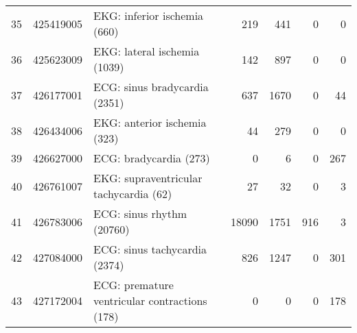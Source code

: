 \begin{tabular}{lllrrrr}
35 & 425419005 & EKG: inferior ischemia (660) & {\cellcolor[HTML]{8DBFA2}} \color[HTML]{000000} 219 & {\cellcolor[HTML]{2E8B57}} \color[HTML]{F1F1F1} 441 & {\cellcolor[HTML]{EBF3ED}} \color[HTML]{000000} 0 & {\cellcolor[HTML]{EBF3ED}} \color[HTML]{000000} 0 \\
36 & 425623009 & EKG: lateral ischemia (1039) & {\cellcolor[HTML]{CDE2D6}} \color[HTML]{000000} 142 & {\cellcolor[HTML]{2E8B57}} \color[HTML]{F1F1F1} 897 & {\cellcolor[HTML]{EBF3ED}} \color[HTML]{000000} 0 & {\cellcolor[HTML]{EBF3ED}} \color[HTML]{000000} 0 \\
37 & 426177001 & ECG: sinus bradycardia (2351) & {\cellcolor[HTML]{A3CBB4}} \color[HTML]{000000} 637 & {\cellcolor[HTML]{2E8B57}} \color[HTML]{F1F1F1} 1670 & {\cellcolor[HTML]{EBF3ED}} \color[HTML]{000000} 0 & {\cellcolor[HTML]{E7F0EA}} \color[HTML]{000000} 44 \\
38 & 426434006 & EKG: anterior ischemia (323) & {\cellcolor[HTML]{CDE2D6}} \color[HTML]{000000} 44 & {\cellcolor[HTML]{2E8B57}} \color[HTML]{F1F1F1} 279 & {\cellcolor[HTML]{EBF3ED}} \color[HTML]{000000} 0 & {\cellcolor[HTML]{EBF3ED}} \color[HTML]{000000} 0 \\
39 & 426627000 & ECG: bradycardia (273) & {\cellcolor[HTML]{EBF3ED}} \color[HTML]{000000} 0 & {\cellcolor[HTML]{E7F1EA}} \color[HTML]{000000} 6 & {\cellcolor[HTML]{EBF3ED}} \color[HTML]{000000} 0 & {\cellcolor[HTML]{2E8B57}} \color[HTML]{F1F1F1} 267 \\
40 & 426761007 & EKG: supraventricular tachycardia (62) & {\cellcolor[HTML]{4B9B6E}} \color[HTML]{F1F1F1} 27 & {\cellcolor[HTML]{2E8B57}} \color[HTML]{F1F1F1} 32 & {\cellcolor[HTML]{EBF3ED}} \color[HTML]{000000} 0 & {\cellcolor[HTML]{D9E9DF}} \color[HTML]{000000} 3 \\
41 & 426783006 & ECG: sinus rhythm (20760) & {\cellcolor[HTML]{2E8B57}} \color[HTML]{F1F1F1} 18090 & {\cellcolor[HTML]{D9E9DF}} \color[HTML]{000000} 1751 & {\cellcolor[HTML]{E2EEE6}} \color[HTML]{000000} 916 & {\cellcolor[HTML]{EBF3ED}} \color[HTML]{000000} 3 \\
42 & 427084000 & ECG: sinus tachycardia (2374) & {\cellcolor[HTML]{6EAE8A}} \color[HTML]{F1F1F1} 826 & {\cellcolor[HTML]{2E8B57}} \color[HTML]{F1F1F1} 1247 & {\cellcolor[HTML]{EBF3ED}} \color[HTML]{000000} 0 & {\cellcolor[HTML]{BEDAC9}} \color[HTML]{000000} 301 \\
43 & 427172004 & ECG: premature ventricular contractions (178) & {\cellcolor[HTML]{EBF3ED}} \color[HTML]{000000} 0 & {\cellcolor[HTML]{EBF3ED}} \color[HTML]{000000} 0 & {\cellcolor[HTML]{EBF3ED}} \color[HTML]{000000} 0 & {\cellcolor[HTML]{2E8B57}} \color[HTML]{F1F1F1} 178 \\

\end{tabular}
